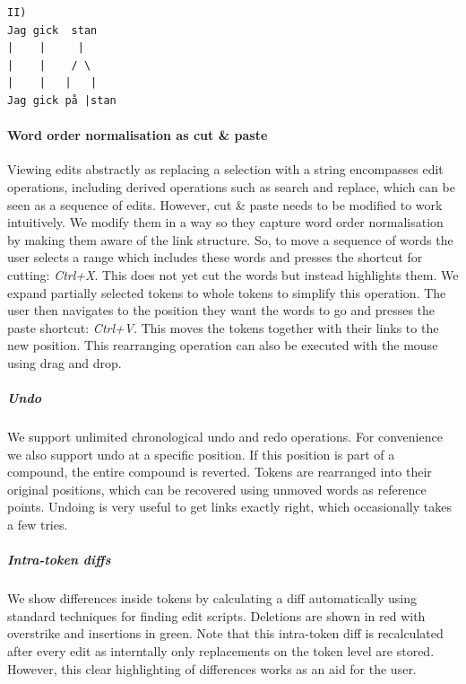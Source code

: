 \documentclass[10pt, a4paper]{article}
\newcommand{\dan}[1]{{\color{Fuchsia}{Dan: #1}}}
\begin{document}
\begin{verbatim}
II)
Jag gick  stan
|    |     |
|    |    / \
|    |   |   |
Jag gick på |stan
\end{verbatim}


\paragraph{Word order normalisation as cut \& paste}
Viewing edits abstractly as replacing a selection with a string encompasses
edit operations, including derived operations such as search and replace,
which can be seen as a sequence of edits. However, cut \& paste needs to
be modified to work intuitively. We modify them in a way so they capture
word order normalisation by making them aware of the link structure.
So, to move a sequence of words the user selects a range
which includes these words and presses the shortcut for cutting: {\it Ctrl+X}.
This does not yet cut the words but instead highlights them. We expand partially
selected tokens to whole tokens to simplify this operation. The user then
navigates to the position they want the words to go and presses the paste
shortcut: {\it Ctrl+V}.
This moves the tokens together with their links to the new position.
This rearranging operation can also be executed with the mouse using drag and drop.
\dan{Intend to add image with example showing this step by step}

\subparagraph{Undo} We support unlimited chronological undo and redo operations.
For convenience we also support undo at a specific position. %
If this position is part of a compound, the entire compound is reverted.
Tokens are rearranged into their original positions, which
can be recovered using unmoved words as reference points.
Undoing is very useful to get links exactly right, which occasionally takes a
few tries.

\subparagraph{Intra-token diffs} We show differences inside tokens by
calculating a diff automatically using standard techniques for finding
edit scripts.  Deletions are shown in red with overstrike and insertions
in green. \dan{refer to the picture}
Note that this intra-token diff is recalculated after every edit
as interntally only replacements on the token level are stored.  However,
this clear highlighting of differences works as an aid for the user.
\end{document}
